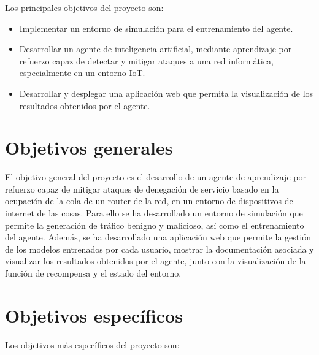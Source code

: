 
Los principales objetivos del proyecto son:
\begin{itemize}
    \item Implementar un entorno de simulación para el entrenamiento del agente.
    \item Desarrollar un agente de inteligencia artificial, mediante aprendizaje por refuerzo capaz de detectar y mitigar ataques a una red informática, especialmente en un entorno IoT.
    \item Desarrollar y desplegar una aplicación web que permita la visualización de los resultados obtenidos por el agente.
\end{itemize}

\section{Objetivos generales}
El objetivo general del proyecto es el desarrollo de un agente de aprendizaje por refuerzo capaz de mitigar ataques de denegación de servicio basado en la ocupación de la cola de un router de la red, en un entorno de dispositivos de internet de las cosas. Para ello se ha desarrollado un entorno de simulación que permite la generación de tráfico benigno y malicioso, así como el entrenamiento del agente. Además, se ha desarrollado una aplicación web que permite la gestión de los modelos entrenados por cada usuario, mostrar la documentación asociada y visualizar los resultados obtenidos por el agente, junto con la visualización de la función de recompensa y el estado del entorno.

\section{Objetivos específicos}
Los objetivos más específicos del proyecto son:

